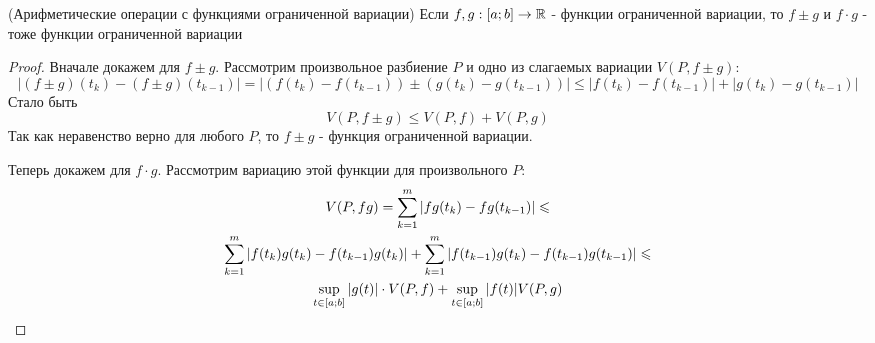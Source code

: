 \begin{theorem} (Арифметические операции с функциями ограниченной вариации)
	Если $f, g: [a; b] \to \mathbb{R}$ - функции ограниченной вариации, то $f \pm g$ и $f \cdot g$ - тоже функции ограниченной вариации
\end{theorem}

\begin{proof}
	Вначале докажем для $f \pm g$. Рассмотрим произвольное разбиение $P$ и одно из слагаемых вариации $V(P, f \pm g)$:
	\[
		|(f \pm g)(t_k) - (f \pm g)(t_{k - 1})| = |(f(t_k) - f(t_{k - 1})) \pm (g(t_k) - g(t_{k - 1}))| \le |f(t_k) - f(t_{k - 1})| + |g(t_k) - g(t_{k - 1})|
	\]
	Стало быть
	\[
		V(P, f \pm g) \le V(P, f) + V(P, g)
	\]
	Так как неравенство верно для любого $P$, то $f \pm g$ - функция ограниченной вариации.
	
	Теперь докажем для $f \cdot g$. Рассмотрим вариацию этой функции для произвольного $P$:
	\begin{multline*}
		V(P, fg) = \sum\limits_{k = 1}^m |fg(t_k) - fg(t_{k - 1})| \leqslant
		\\
		\sum\limits_{k = 1}^m |f(t_k)g(t_k) - f(t_{k - 1})g(t_k)| + \sum\limits_{k = 1}^m |f(t_{k - 1})g(t_k) - f(t_{k - 1})g(t_{k - 1})| \leqslant
		\\
		\sup\limits_{t \in [a; b]} |g(t)| \cdot V(P, f) + \sup\limits_{t \in [a; b]} |f(t)| V(P, g)
	\end{multline*}
\end{proof}